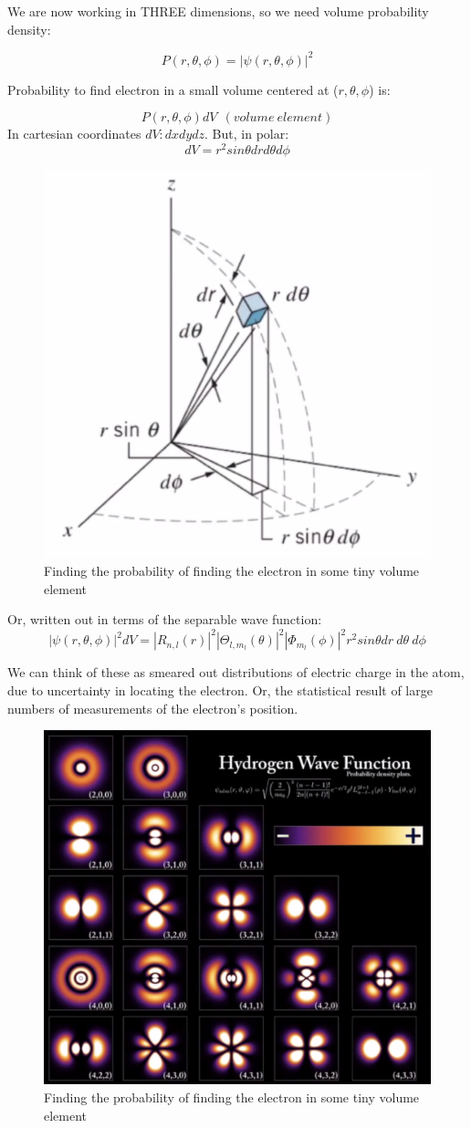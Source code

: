 \documentclass[class=article,crop=false]{standalone}
\begin{document}
We are now working in THREE dimensions, so we need volume probability density:

$$P(r, \theta, \phi) = |\psi(r, \theta, \phi)|^2 $$

Probability to find electron in a small volume centered at ($r, \theta, \phi$) is:

$$P(r, \theta, \phi) dV \ \ (volume\ element) $$
In cartesian coordinates $dV: dxdydz$. But, in polar:
$$ dV = r^2 sin\theta dr d\theta d\phi $$


\begin{figure}[h!]
	\centering
	\includegraphics[width=.3\linewidth]{./Images/3d_probability.png}
	\caption{Finding the probability of finding the electron in some tiny volume element}
\end{figure}

Or, written out in terms of the separable wave function:
$$ |\psi(r, \theta, \phi)|^2 dV = |R_{n,l}(r)|^2 |\Theta_{l,m_l}(\theta)|^2 |\Phi_{m_l}(\phi)|^2 r^2 sin\theta dr\ d\theta\ d\phi $$

We can think of these as smeared out distributions of electric charge in the atom, due to uncertainty in locating the electron. Or, the statistical result of large numbers of measurements of the electron's position.\\


\begin{figure}[h!]
	\centering
	\includegraphics[width=1\linewidth]{./Images/hydrogen_wave_function.png}
	\caption{Finding the probability of finding the electron in some tiny volume element}
\end{figure}
\end{document}
